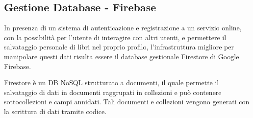 \documentclass{article}
\begin{document}
\subsection{Gestione Database - Firebase}
In presenza di un sistema di autenticazione e registrazione a un servizio online, con la possibilità per l'utente di interagire con altri utenti, e permettere il salvataggio personale di libri nel proprio profilo,
l'infrastruttura migliore per manipolare questi dati risulta essere il database gestionale Firestore di Google Firebase.

Firestore è un DB NoSQL strutturato a documenti, il quale permette il salvataggio di dati in documenti raggrupati in collezioni e può contenere sottocollezioni e campi annidati. Tali documenti e collezioni vengono generati con la scrittura di dati tramite codice.
\end{document}
